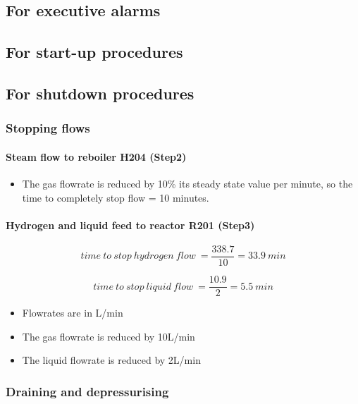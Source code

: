 \subsection{For executive alarms}

\subsection{For start-up procedures}

\subsection{For shutdown procedures}

\subsubsection{Stopping flows}
\paragraph{Steam flow to reboiler H204 (Step2)}   
    \begin{itemize}
        \item The gas flowrate is reduced by 10\% its steady state value per minute, so the time to completely stop flow = 10 minutes.
    \end{itemize}


\paragraph{Hydrogen and liquid feed to reactor R201 (Step3)}
    \begin{equation}
        time\:to\:stop\:hydrogen\:flow\:=\frac{338.7}{10}=33.9\:min
    \end{equation}
    
    \begin{equation}
        time\:to\:stop\:liquid\:flow\:=\frac{10.9}{2}=5.5\:min
    \end{equation}
    
    \begin{itemize}
        \item Flowrates are in L/min
        \item The gas flowrate is reduced by 10L/min
        \item The liquid flowrate is reduced by 2L/min
    \end{itemize}
 
\subsubsection{Draining and depressurising}   
